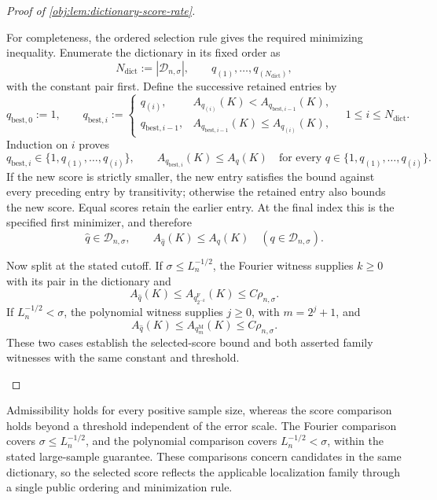 \documentclass[11pt]{article}
\begin{document}
\begin{proof}[Proof of \cref{obj:lem:dictionary-score-rate}]
\begin{enumerate}
For completeness, the ordered selection rule gives the required minimizing inequality. Enumerate the dictionary in its fixed order as
\[
N_{\mathrm{dict}}:=|\mathcal D_{n,\sigma}|,
\qquad
q_{(1)},\ldots,q_{(N_{\mathrm{dict}})},
\]
with the constant pair first. Define the successive retained entries by
\[
q_{\mathrm{best},0}:=1,
\qquad
q_{\mathrm{best},i}:=
\begin{cases}
q_{(i)},&A_{q_{(i)}}(K)<A_{q_{\mathrm{best},i-1}}(K),\\
q_{\mathrm{best},i-1},&A_{q_{\mathrm{best},i-1}}(K)\le A_{q_{(i)}}(K),
\end{cases}
\quad 1\le i\le N_{\mathrm{dict}}.
\]
Induction on \(i\) proves
\[
q_{\mathrm{best},i}\in\{1,q_{(1)},\ldots,q_{(i)}\},
\qquad
A_{q_{\mathrm{best},i}}(K)\le A_q(K)
\quad
\text{for every }q\in\{1,q_{(1)},\ldots,q_{(i)}\}.
\]
If the new score is strictly smaller, the new entry satisfies the bound against every preceding entry by transitivity; otherwise the retained entry also bounds the new score. Equal scores retain the earlier entry. At the final index this is the specified first minimizer, and therefore
\[
\widehat q\in\mathcal D_{n,\sigma},
\qquad
A_{\widehat q}(K)\le A_q(K)
\quad(q\in\mathcal D_{n,\sigma}).
\]

Now split at the stated cutoff. If \(\sigma\le L_n^{-1/2}\), the Fourier witness supplies \(k\ge0\) with its pair in the dictionary and
\[
A_{\widehat q}(K)\le A_{q_{2^{-k}}^{\mathrm F}}(K)
\le C\rho_{n,\sigma}.
\]
If \(L_n^{-1/2}<\sigma\), the polynomial witness supplies \(j\ge0\), with \(m=2^j+1\), and
\[
A_{\widehat q}(K)\le A_{q_m^{\mathrm M}}(K)
\le C\rho_{n,\sigma}.
\]
These two cases establish the selected-score bound and both asserted family witnesses with the same constant and threshold.
\end{enumerate}
\end{proof}

Admissibility holds for every positive sample size, whereas the score comparison holds beyond a threshold independent of the error scale. The Fourier comparison covers \(\sigma\le L_n^{-1/2}\), and the polynomial comparison covers \(L_n^{-1/2}<\sigma\), within the stated large-sample guarantee. These comparisons concern candidates in the same dictionary, so the selected score reflects the applicable localization family through a single public ordering and minimization rule.
\end{document}
